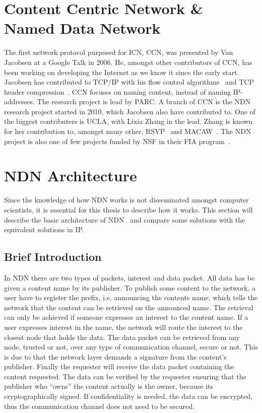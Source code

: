 \section{Content Centric Network \& Named Data Network}\label{chp2:sec:icn}
The first network protocol purposed for \gls{ICN}, \gls{CCN}, was presented by Van Jacobsen at a Google Talk in 2006. 
He, amongst other contributors of \gls{CCN}, has been working on developing the Internet as we know it since the early start.
Jacobsen has contributed to \gls{TCP}/\gls{IP} with his flow control algorithms~\cite{DBLP:conf/sigcomm/Jacobson88} and \gls{TCP} header compression~\cite{rfc1144}.
\gls{CCN} focuses on naming content, instead of naming \gls{IP}-addresses. 
The research project is lead by \gls{PARC}.
A branch of \gls{CCN} is the \gls{NDN}~\cite{DBLP:journals/ccr/0001ABJcCPWZ14} research project started in 2010, which Jacobsen also have contributed to.
One of the biggest contributers is \gls{UCLA}, with Lixia Zhang in the lead. 
Zhang is known for her contribution to, amongst many other, \gls{RSVP}~\cite{rfc2205} and \gls{MACAW}~\cite{DBLP:conf/sigcomm/BharghavanDSZ94}.
The \gls{NDN} project is also one of few projects funded by \gls{NSF} in their \gls{FIA} program~\cite{nsf-fia}.

\section{NDN Architecture}\label{chp2:sec:ndn_architecture}
Since the knowledge of how \gls{NDN} works is not disseminated amongst computer scientists, it is essential for this thesis to describe how it works.
This section will describe the basic architecture of \gls{NDN}~\cite{NDN-0021} and compare some solutions with the equivalent solutions in \gls{IP}.

\subsection{Brief Introduction}
In \gls{NDN} there are two types of packets, \gls{interest} and \gls{data} packet.
All \gls{data} has be given a content \gls{name} by its \gls{publisher}. 
To publish some content to the network, a user have to register the prefix, i.e. announcing the contents \gls{name}, which tells the network that the content can be retrieved on the announced \gls{name}. 
The retrieval can only be achieved if someone expresses an \gls{interest} to the content \gls{name}.
If a user expresses \gls{interest} in the \gls{name}, the network will route the \gls{interest} to the closest \gls{node} that holds the \gls{data}. 
The \gls{data} packet can be retrieved from any \gls{node}, trusted or not, over any type of communication channel, secure or not. 
This is due to that the network layer demands a signature from the content's \gls{publisher}.
Finally the \gls{requester} will receive the \gls{data} packet containing the content requested.
The \gls{data} can be verified by the requester ensuring that the \gls{publisher} who ``owns'' the content actually is the owner, because its cryptographically signed.
If confidentiality is needed, the \gls{data} can be encrypted, thus the communication channel does not need to be secured. 

